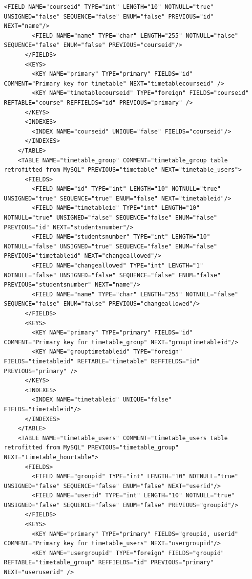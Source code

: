 \documentclass[a4paper]{report}  %
\begin{document}
\begin{lstlisting}[style=XML,caption=Fitxer xmldb install.xml per la creació de les taules]
        <FIELD NAME="courseid" TYPE="int" LENGTH="10" NOTNULL="true" UNSIGNED="false" SEQUENCE="false" ENUM="false" PREVIOUS="id" NEXT="name"/>
        <FIELD NAME="name" TYPE="char" LENGTH="255" NOTNULL="false" SEQUENCE="false" ENUM="false" PREVIOUS="courseid"/>
      </FIELDS>
      <KEYS>
        <KEY NAME="primary" TYPE="primary" FIELDS="id" COMMENT="Primary key for timetable" NEXT="timetablecourseid" />
		<KEY NAME="timetablecourseid" TYPE="foreign" FIELDS="courseid" REFTABLE="course" REFFIELDS="id" PREVIOUS="primary" />
      </KEYS>
      <INDEXES>
        <INDEX NAME="courseid" UNIQUE="false" FIELDS="courseid"/>
      </INDEXES>
    </TABLE>
    <TABLE NAME="timetable_group" COMMENT="timetable_group table retrofitted from MySQL" PREVIOUS="timetable" NEXT="timetable_users">
      <FIELDS>
        <FIELD NAME="id" TYPE="int" LENGTH="10" NOTNULL="true" UNSIGNED="true" SEQUENCE="true" ENUM="false" NEXT="timetableid"/>
        <FIELD NAME="timetableid" TYPE="int" LENGTH="10" NOTNULL="true" UNSIGNED="false" SEQUENCE="false" ENUM="false" PREVIOUS="id" NEXT="studentsnumber"/>
        <FIELD NAME="studentsnumber" TYPE="int" LENGTH="10" NOTNULL="false" UNSIGNED="true" SEQUENCE="false" ENUM="false" PREVIOUS="timetableid" NEXT="changeallowed"/>
        <FIELD NAME="changeallowed" TYPE="int" LENGTH="1" NOTNULL="false" UNSIGNED="false" SEQUENCE="false" ENUM="false" PREVIOUS="studentsnumber" NEXT="name"/>
        <FIELD NAME="name" TYPE="char" LENGTH="255" NOTNULL="false" SEQUENCE="false" ENUM="false" PREVIOUS="changeallowed"/>
      </FIELDS>
      <KEYS>
        <KEY NAME="primary" TYPE="primary" FIELDS="id" COMMENT="Primary key for timetable_group" NEXT="grouptimetableid"/>
		<KEY NAME="grouptimetableid" TYPE="foreign" FIELDS="timetableid" REFTABLE="timetable" REFFIELDS="id" PREVIOUS="primary" />
      </KEYS>
      <INDEXES>
        <INDEX NAME="timetableid" UNIQUE="false" FIELDS="timetableid"/>
      </INDEXES>
    </TABLE>
    <TABLE NAME="timetable_users" COMMENT="timetable_users table retrofitted from MySQL" PREVIOUS="timetable_group" NEXT="timetable_hourtable">
      <FIELDS>
        <FIELD NAME="groupid" TYPE="int" LENGTH="10" NOTNULL="true" UNSIGNED="false" SEQUENCE="false" ENUM="false" NEXT="userid"/>
        <FIELD NAME="userid" TYPE="int" LENGTH="10" NOTNULL="true" UNSIGNED="false" SEQUENCE="false" ENUM="false" PREVIOUS="groupid"/>
      </FIELDS>
      <KEYS>
        <KEY NAME="primary" TYPE="primary" FIELDS="groupid, userid" COMMENT="Primary key for timetable_users" NEXT="usergroupid"/>
		<KEY NAME="usergroupid" TYPE="foreign" FIELDS="groupid" REFTABLE="timetable_group" REFFIELDS="id" PREVIOUS="primary" NEXT="useruserid" />

\end{lstlisting}
\end{document}

